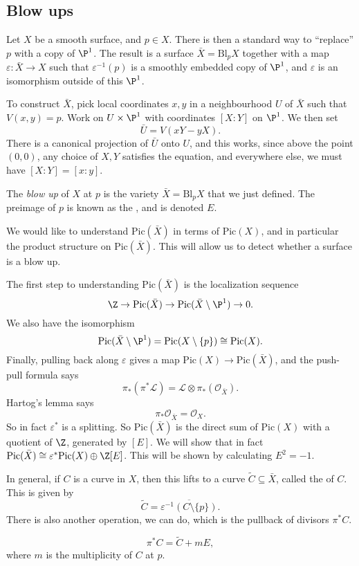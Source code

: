 \documentclass[a4paper]{article}
\newcommand\Pic{\mathrm{Pic}}
\newcommand\Bl{\mathrm{Bl}}
\begin{document}
\subsection{Blow ups}
Let $X$ be a smooth surface, and $p \in X$. There is then a standard way to ``replace'' $p$ with a copy of $\P^1$. The result is a surface $\bar{X} = \Bl_p X$ together with a map $\varepsilon: \bar{X} \to X$ such that $\varepsilon^{-1}(p)$ is a smoothly embedded copy of $\P^1$, and $\varepsilon$ is an isomorphism outside of this $\P^1$.

To construct $\bar{X}$, pick local coordinates $x, y$ in a neighbourhood $U$ of $\bar{X}$ such that $V(x, y) = p$. Work on $U \times \P^1$ with coordinates $[X: Y]$ on $\P^1$. We then set
\[
  \bar{U} = V(xY - yX).
\]
There is a canonical projection of $\bar{U}$ onto $U$, and this works, since above the point $(0, 0)$, any choice of $X, Y$ satisfies the equation, and everywhere else, we must have $[X:Y] = [x:y]$.

\begin{defi}[Blow up]
  The \emph{blow up} of $X$ at $p$ is the variety $\bar{X} = \Bl_p X$ that we just defined. The preimage of $p$ is known as the , and is denoted $E$.
\end{defi}

We would like to understand $\Pic(\bar{X})$ in terms of $\Pic(X)$, and in particular the product structure on $\Pic(\bar{X})$. This will allow us to detect whether a surface is a blow up.

The first step to understanding $\Pic(\bar{X})$ is the localization sequence
\[
  \Z \to \Pic(\bar{X}) \to \Pic(\bar{X} \setminus \P^1) \to 0.
\]
We also have the isomorphism
\[
  \Pic(\bar{X} \setminus \P^1) = \Pic(X \setminus \{p\}) \cong \Pic(X).
\]
Finally, pulling back along $\varepsilon$ gives a map $\Pic(X) \to \Pic(\bar{X})$, and the push-pull formula says
\[
  \pi_* (\pi^* \mathcal{L}) = \mathcal{L} \otimes \pi_*(\mathcal{O}_{\bar{X}}).
\]
Hartog's lemma says
\[
  \pi_* \mathcal{O}_{\bar{X}} = \mathcal{O}_X.
\]
So in fact $\varepsilon^*$ is a splitting. So $\Pic(\bar{X})$ is the direct sum of $\Pic(X)$ with a quotient of $\Z$, generated by $[E]$. We will show that in fact $\Pic(\bar{X}) \cong \varepsilon^* \Pic(X) \oplus \Z[E]$. This will be shown by calculating $E^2 = -1$.

In general, if $C$ is a curve in $X$, then this lifts to a curve $\tilde{C} \subseteq \bar{X}$, called the  of $C$. This is given by
\[
  \tilde{C} = \overline{\varepsilon^{-1}(C \setminus \{p\})}.
\]
There is also another operation, we can do, which is the pullback of divisors $\pi^* C$.
\begin{lemma}
  \[
    \pi^* C = \tilde{C} + mE,
  \]
  where $m$ is the multiplicity of $C$ at $p$.
\end{lemma}
\end{document}
